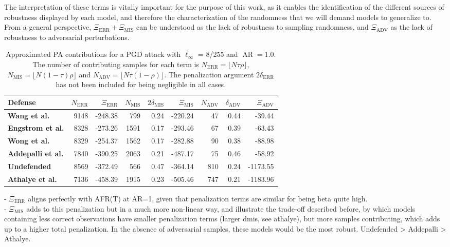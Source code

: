 The interpretation of these terms is vitally important for the purpose of this work, as it enables
the identification of the different sources of robustness displayed by each model, and therefore
the characterization of the randomness that we will demand models to generalize to. From a general 
perspective, $\Xi_{\text{ERR}} + \Xi_{\text{MIS}}$ can be understood as the lack of robustness
to sampling randomness, and $\Xi_{\text{ADV}}$ as the lack of robustness to adversarial perturbations. \\

\begin{table}[H]
    \centering
    \begin{tabular}{l|rr|rrr|rrr}
    Defense & $N_{\text{ERR}}$ & $\Xi_{\text{ERR}}$ & $N_{\text{MIS}}$ & $2 \delta_{\text{MIS}}$ & $\Xi_{\text{MIS}}$ & $N_{\text{ADV}}$ & $\delta_{\text{ADV}}$ & $\Xi_{\text{ADV}}$ \\
    \midrule
    {\color{tab:brown} \textbf{Wang et al.}} & 9148  & -248.38 & 799 & 0.24 & -220.24 & 47 & 0.44 & -39.44 \\
    {\color{tab:blue} \textbf{Engstrom et al.}} & 8328  & -273.26 & 1591 & 0.17 & -293.46 & 67 & 0.39 & -63.43 \\
    {\color{tab:red} \textbf{Wong et al.}} & 8329  & -254.37 & 1562 & 0.17 & -282.88 & 90 & 0.38 & -88.98 \\
    {\color{tab:purple} \textbf{Addepalli et al.}} & 7840  & -390.25 & 2063 & 0.21 & -487.17 & 75 & 0.46 & -58.92 \\
    {\color{tab:orange} \textbf{Undefended}} & 8569  & -372.49 & 566 & 0.47 & -364.14 & 810 & 0.24 & -1173.55 \\
    {\color{tab:green} \textbf{Athalye et al.}} & 7136 & -458.39 & 1915 & 0.23 & -505.46 & 747 & 0.21 & -1183.96 \\
    \bottomrule
    \end{tabular}
    \caption{
    Approximated PA contributions for a PGD attack with $\ell_\infty$ = 8/255 and 
    $\operatorname{AR} = 1.0$. The number of contributing samples for each term is 
    $N_{\text{ERR}} = \lfloor N \tau \rho \rfloor$, $N_{\text{MIS}} = \lfloor N (1-\tau) \rho \rfloor$ and
    $N_{\text{ADV}} = \lfloor N \tau (1-\rho) \rfloor$. The penalization argument $2 \delta_{\text{ERR}}$ has not
    been included for being negligible in all cases.
    }
    \label{tab:approx_pa_pgd_table}
\end{table}

- $\Xi_{\text{ERR}}$ aligns perfectly with AFR(T) at AR=1, given that penalization terms are 
similar for being beta quite high.\\
- $\Xi_{\text{MIS}}$ adds to this penalization but in a much more non-linear way, and illustrate
the trade-off described before, by which models containing less correct observations have smaller
penalization terms (larger dmis, see athalye), but more samples contributing, which adds up
to a higher total penalization. In the absence of adversarial samples, these models would be the most
robust. Undefended > Addepalli > Athalye.\\

